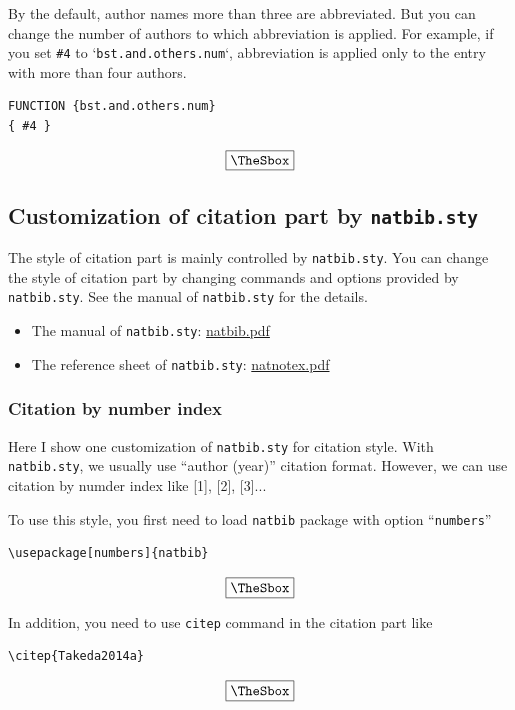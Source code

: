 \documentclass[10pt]{article}
\newenvironment{Frame}%
{\setlength{\fboxsep}{15pt}
\setlength{\mylength}{\linewidth}%
\addtolength{\mylength}{-2\fboxsep}%
\addtolength{\mylength}{-2\fboxrule}%
\Sbox
\minipage{\mylength}%
\setlength{\abovedisplayskip}{0pt}%
\setlength{\belowdisplayskip}{0pt}%
}%
{\endminipage\endSbox
\[\fbox{\TheSbox}\]}
\begin{document}
By the default, author names more than three are abbreviated. But you can change
the number of authors to which abbreviation is applied.  For example, if you set
\verb|#4| to `\texttt{bst.and.others.num}`, abbreviation is applied only to the
entry with more than four authors.
\begin{Frame}
\begin{verbatim}
FUNCTION {bst.and.others.num}
{ #4 }
\end{verbatim} 
\end{Frame}

\subsection{Customization of citation part by \texttt{natbib.sty}}

The style of citation part is mainly controlled by \texttt{natbib.sty}. You can
change the style of citation part by changing commands and options provided by
\texttt{natbib.sty}.
See the manual of \texttt{natbib.sty} for the details. 
\begin{itemize}
 \item The manual of \texttt{natbib.sty}:
       \href{https://mirror.ctan.org/macros/latex/contrib/natbib/natbib.pdf}{natbib.pdf}
 \item The reference sheet of \texttt{natbib.sty}:
       \href{https://mirror.ctan.org/macros/latex/contrib/natbib/natnotes.pdf}{natnotex.pdf}
\end{itemize}

\subsubsection{Citation by number index}

Here I show one customization of \texttt{natbib.sty} for citation style.  With
\texttt{natbib.sty}, we usually use ``author (year)'' citation format. However,
we can use citation by numder index like [1], [2], [3]...

To use this style, you first need to load \texttt{natbib} package with option
``\texttt{numbers}''
\begin{Frame}
\begin{verbatim}
\usepackage[numbers]{natbib}        
\end{verbatim} 
\end{Frame}

In addition, you need to use \texttt{citep} command in the citation part like
\begin{Frame}
\begin{verbatim}
\citep{Takeda2014a}
\end{verbatim} 
\end{Frame}
\end{document}
